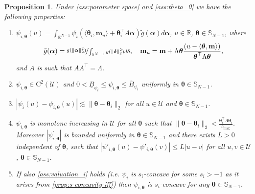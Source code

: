\documentclass{article} %
\newtheorem{proposition}[theorem]{Proposition}
\begin{document}
\begin{proposition}\label{proposition:S_theta_properties}
Under \cref{ass:parameter space} and \cref{ass:theta_0} we have the following properties:
\begin{enumerate}[leftmargin=*, label=(\arabic*)]
\item $\psi_{i,\boldsymbol{\theta}}(u)= \int_{\mathbb{R}^{N-1}} \psi_i\left(\langle\boldsymbol{\theta}_i,\mathbf{m}_u\rangle+\boldsymbol{\theta}_i^{\top}A \boldsymbol{\alpha}\right) \tilde{g}(\boldsymbol{\alpha})d\boldsymbol{\alpha}$, $u \in \mathbb{R}$, $\boldsymbol{\theta} \in \mathbb{S}_{N-1}$, where $$\tilde{g}(\boldsymbol{\alpha})=\nicefrac{g(\|\boldsymbol{\alpha}\|_2^2)}{\int_{\mathbb{R}^{N-1}} g(\|\boldsymbol{\delta}\|_2^2) d \boldsymbol{\delta}},\quad  \mathbf{m}_u = \mathbf{m}+\Lambda \boldsymbol{\theta} \frac{\left(u-\langle\boldsymbol{\theta}, \mathbf{m}\rangle\right)}{\boldsymbol{\theta}^{\top} \Lambda \boldsymbol{\theta}},$$
and $A$ is such that $AA^{\top} = \Lambda$.
\item $\psi_{i,\boldsymbol{\theta}} \in \mathrm{C}^2(\mathcal{U})$ and $0<\underline{B}_{\psi_i} \leq \psi_{i,\boldsymbol{\theta}}\leq \bar{B}_{\psi_i}$ uniformly in $\boldsymbol{\theta}\in \mathbb{S}_{N-1}$.
\item $|\psi_i(u)-\psi_{i,\boldsymbol{\theta}}(u)|\lesssim \|\boldsymbol{\theta}-\boldsymbol{\theta}_i\|_2$ for all $u \in \mathcal{U}$ and $\boldsymbol{\theta} \in \mathbb{S}_{N-1}$.
\item $\psi_{i,\boldsymbol{\theta}}$ is monotone increasing in $\mathcal{U}$ for all $\boldsymbol{\theta}$ such that $\|\boldsymbol{\theta}-\boldsymbol{\theta}_i\|_2 <\frac{\boldsymbol{\theta}_i^{\top}\Lambda \boldsymbol{\theta}_i}{c_{\max}}$. Moreover $|\psi^{\prime}_{i,\boldsymbol{\theta}}|$ is bounded uniformly in $\boldsymbol{\theta} \in \mathbb{S}_{N-1}$ and there exists $L>0$ independent of $\boldsymbol{\theta}$, such that $|\psi'_{i,\boldsymbol{\theta}}(u)-\psi'_{i,\boldsymbol{\theta}}(v)|\leq L|u-v|$ for all $u,v \in \mathcal{U}$, $\boldsymbol{\theta} \in \mathbb{S}_{N-1}$.
\item If also \cref{ass:valuation_i} holds (i.e. $\psi_i$ is $s_i$-concave for some $s_i> -1$ as it arises from \cref{prop:s-concavity-iff}) then $\psi_{i,\boldsymbol{\theta}}$ is $s_i$-concave for any $\boldsymbol{\theta} \in \mathbb{S}_{N-1}$. 
\end{enumerate}
\end{proposition}
\noindent
\end{document}
